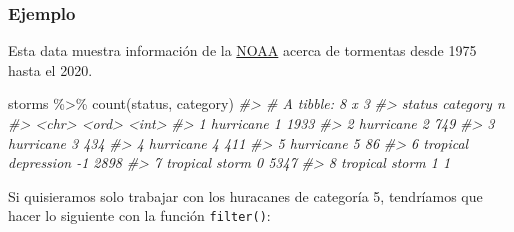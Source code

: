\documentclass[
]{book}
\newenvironment{Shaded}{\begin{snugshade}}{\end{snugshade}}
\newcommand{\CommentTok}[1]{\textcolor[rgb]{0.56,0.35,0.01}{\textit{#1}}}
\newcommand{\FunctionTok}[1]{\textcolor[rgb]{0.00,0.00,0.00}{#1}}
\newcommand{\NormalTok}[1]{#1}
\newcommand{\SpecialCharTok}[1]{\textcolor[rgb]{0.00,0.00,0.00}{#1}}
\begin{document}
\hypertarget{ejemplo-2}{%
\subsubsection{Ejemplo}\label{ejemplo-2}}

Esta data muestra información de la \href{https://www.nhc.noaa.gov/data/\#hurdat}{NOAA} acerca de tormentas desde 1975 hasta el 2020.

\begin{Shaded}
\begin{Highlighting}[]
\NormalTok{storms }\SpecialCharTok{\%\textgreater{}\%} 
  \FunctionTok{count}\NormalTok{(status, category)}
\CommentTok{\#\textgreater{} \# A tibble: 8 x 3}
\CommentTok{\#\textgreater{}   status              category     n}
\CommentTok{\#\textgreater{}   \textless{}chr\textgreater{}               \textless{}ord\textgreater{}    \textless{}int\textgreater{}}
\CommentTok{\#\textgreater{} 1 hurricane           1         1933}
\CommentTok{\#\textgreater{} 2 hurricane           2          749}
\CommentTok{\#\textgreater{} 3 hurricane           3          434}
\CommentTok{\#\textgreater{} 4 hurricane           4          411}
\CommentTok{\#\textgreater{} 5 hurricane           5           86}
\CommentTok{\#\textgreater{} 6 tropical depression {-}1        2898}
\CommentTok{\#\textgreater{} 7 tropical storm      0         5347}
\CommentTok{\#\textgreater{} 8 tropical storm      1            1}
\end{Highlighting}
\end{Shaded}

Si quisieramos solo trabajar con los huracanes de categoría 5, tendríamos que hacer lo siguiente con la función \texttt{filter()}:
\end{document}
